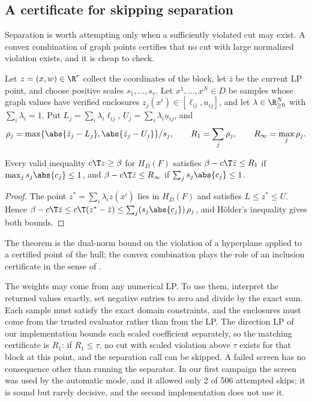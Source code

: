 \subsection{A certificate for skipping separation}\label{sec:screening}

Separation is worth attempting only when a sufficiently violated cut
may exist. A convex combination of graph points certifies that no cut
with large normalized violation exists, and it is cheap to check.

Let $z=(x,w)\in\R^r$ collect the coordinates of the block, let $\bar z$
be the current LP point, and choose positive scales $s_1,\dots,s_r$.
Let $x^1,\dots,x^N\in D$ be samples whose graph values have verified
enclosures $z_j(x^i)\in[\ell_{ij},u_{ij}]$, and let
$\lambda\in\R^N_{\ge0}$ with $\sum_i\lambda_i=1$. Put
$L_j=\sum_i\lambda_i\ell_{ij}$, $U_j=\sum_i\lambda_iu_{ij}$, and
\[
\rho_j=\max\{\abs{\bar z_j-L_j},\abs{\bar z_j-U_j}\}/s_j,\qquad
R_1=\sum_j\rho_j,\qquad R_\infty=\max_j\rho_j.
\]

\begin{theorem}[Screening]\label{thm:screen}
Every valid inequality $c\T z\ge\beta$ for $H_D(F)$ satisfies
$\beta-c\T\bar z\le R_1$ if $\max_js_j\abs{c_j}\le1$, and
$\beta-c\T\bar z\le R_\infty$ if $\sum_js_j\abs{c_j}\le1$.
\end{theorem}

\begin{proof}
The point $z^\ast=\sum_i\lambda_iz(x^i)$ lies in $H_D(F)$ and satisfies
$L\le z^\ast\le U$. Hence
$\beta-c\T\bar z\le c\T(z^\ast-\bar z)\le\sum_j(s_j\abs{c_j})\,\rho_j$,
and H\"older's inequality gives both bounds.
\end{proof}

The theorem is the dual-norm bound on the violation of a hyperplane
\citep{Mangasarian1999} applied to a certified point of the hull; the
convex combination plays the role of an inclusion certificate in the
sense of \citet{Tawarmalani2010}.

The weights may come from any numerical LP. To use them, interpret the
returned values exactly, set negative entries to zero and divide by the
exact sum. Each sample must satisfy the exact domain constraints, and
the enclosures must come from the trusted evaluator rather than from the
LP. The direction LP of our implementation bounds each scaled
coefficient separately, so the matching certificate is $R_1$: if
$R_1\le\tau$, no cut with scaled violation above $\tau$ exists for that
block at this point, and the separation call can be skipped. A failed
screen has no consequence other than running the separator. In our first
campaign the screen was used by the automatic mode, and it allowed only
2 of 506 attempted skips; it is sound but rarely decisive, and the second
implementation does not use it.
